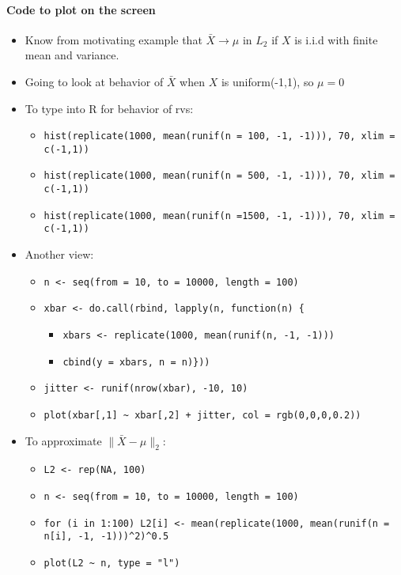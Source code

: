 \paragraph{Code to plot on the screen}
\begin{itemize}
\item Know from motivating example that $\bar X \to \mu$ in $L_2$ if
        $X$ is i.i.d with finite mean and variance.
\item Going to look at behavior of $\bar X$ when $X$ is uniform(-1,1), so $\mu = 0$
\item To type into R for behavior of rvs:
\begin{itemize}
\item \texttt{hist(replicate(1000, mean(runif(n = 100, -1, -1))), 70, xlim = c(-1,1))}
\item \texttt{hist(replicate(1000, mean(runif(n = 500, -1, -1))), 70, xlim = c(-1,1))}
\item \texttt{hist(replicate(1000, mean(runif(n =1500, -1, -1))), 70, xlim = c(-1,1))}
\end{itemize}
\item Another view:
\begin{itemize}
\item \texttt{n <- seq(from = 10, to = 10000, length = 100)}
\item \texttt{xbar <- do.call(rbind, lapply(n, function(n) \{}
\begin{itemize}
\item \texttt{xbars <- replicate(1000, mean(runif(n, -1, -1)))}
\item \texttt{cbind(y = xbars, n = n)\}))}
\end{itemize}
\item \texttt{jitter <- runif(nrow(xbar), -10, 10)}
\item \texttt{plot(xbar[,1] \textasciitilde{} xbar[,2] + jitter, col = rgb(0,0,0,0.2))}
\end{itemize}
\item To approximate $\|\bar X - \mu\|_2$:
\begin{itemize}
\item \texttt{L2 <- rep(NA, 100)}
\item \texttt{n <- seq(from = 10, to = 10000, length = 100)}
\item \texttt{for (i in 1:100)              L2[i] <- mean(replicate(1000, mean(runif(n = n[i], -1, -1)))\textasciicircum{}2)\textasciicircum{}0.5}
\item \texttt{plot(L2 \textasciitilde{} n, type = "l")}
\end{itemize}
\end{itemize}

